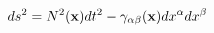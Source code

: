 \begin{equation}
ds^2 = N^2({\bf x}) dt^2 - \gamma_{\alpha\beta}({\bf x})dx^\alpha dx^\beta
\end{equation}

